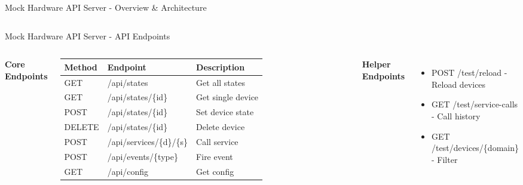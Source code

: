 \documentclass[aspectratio=169, 10pt, xcolor=table]{beamer}
\begin{document}
\begin{frame}{Mock Hardware API Server - Overview \& Architecture}
\begin{columns}[c]
{
            }
    \end{columns}
\end{frame}

\begin{frame}{Mock Hardware API Server - API Endpoints}
    
    \begin{columns}[t]
            \textbf{Core Endpoints}
            \vspace{0.3em}
            
            {\footnotesize
            \begin{tabular}{l l l}
                \toprule
                \textbf{Method} & \textbf{Endpoint} & \textbf{Description} \\
                \midrule
                GET & /api/states & Get all states \\
                GET & /api/states/\{id\} & Get single device \\
                POST & /api/states/\{id\} & Set device state \\
                DELETE & /api/states/\{id\} & Delete device \\
                POST & /api/services/\{d\}/\{s\} & Call service \\
                POST & /api/events/\{type\} & Fire event \\
                GET & /api/config & Get config \\
                \bottomrule
            \end{tabular}
            }
            
            \vspace{0.6em}
            \pause
            \textbf{Helper Endpoints}
            \vspace{0.2em}
            {\footnotesize
            \begin{itemize}
                \item POST /test/reload - Reload devices
                \item GET /test/service-calls - Call history
                \item GET /test/devices/\{domain\} - Filter
            \end{itemize}
            }


\end{columns}
\end{frame}
\end{document}
